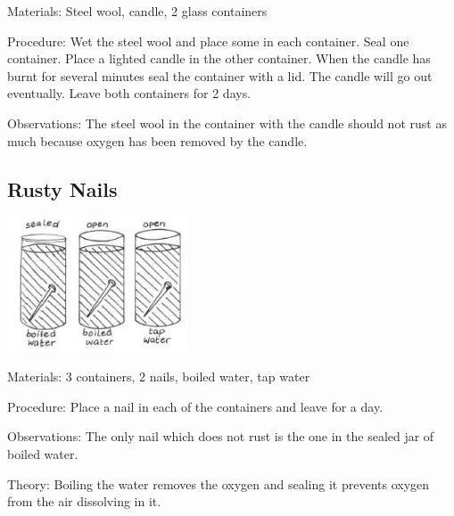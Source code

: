 \begin{multicols}{2}
\begin{description*}
\item[Materials:]{Steel wool, candle, 2 glass containers}
\item[Procedure:]{Wet the steel wool and place some in each container. Seal one
container. Place a lighted candle in the other container. When the
candle has burnt for several minutes seal the container with a lid. The
candle will go out eventually. Leave both containers for 2 days. }
\item[Observations:]{The
steel wool in the container with the candle should not rust as much
because oxygen has been removed by the candle.}
\end{description*}

\columnbreak

\subsection{Rusty Nails}

\begin{center}
\includegraphics[width=0.4\textwidth]{./img/vso/rusty-nails.jpg}
\end{center}

\begin{description*}
\item[Materials:]{3 containers, 2 nails, boiled water, tap water}
\item[Procedure:]{Place a nail in each of the
containers and leave for a day.}
\item[Observations:]{The only nail which does not rust
is the one in the sealed jar of
boiled water.}
\item[Theory:]{Boiling the water
removes the oxygen and sealing it
prevents oxygen from the air
dissolving in it.}
\end{description*}


\end{multicols}
